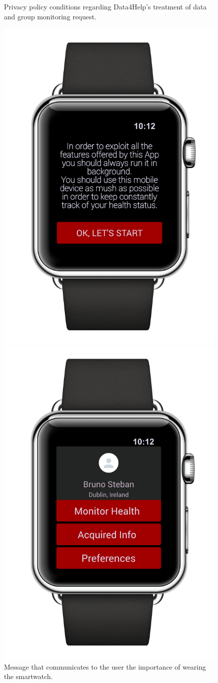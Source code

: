 \begin{enumerate}
\begin{figure}[H]
\begin{center}
\begin{minipage}[c]{.40\textwidth}
	\caption{Privacy policy conditions regarding Data4Help's treatment of data and group monitoring request.}
        \end{minipage}
      \end{center}
\end{figure}
\begin{figure}[H]
\begin{center}
        \begin{minipage}[c]{.40\textwidth}
	\centering
          \includegraphics[height=9.5  cm]{Images/Mockups/AutomatedSOSMockup4.png}
	\caption{Message that communicates to the user the importance of wearing the smartwatch.}
        \end{minipage}%
        \hspace{10mm}%
        \begin{minipage}[c]{.40\textwidth}
	\centering
          \includegraphics[height=9.5 cm]{Images/Mockups/AutomatedSOSMockup5.png}

\end{minipage}
\end{center}
\end{figure}
\end{enumerate}
